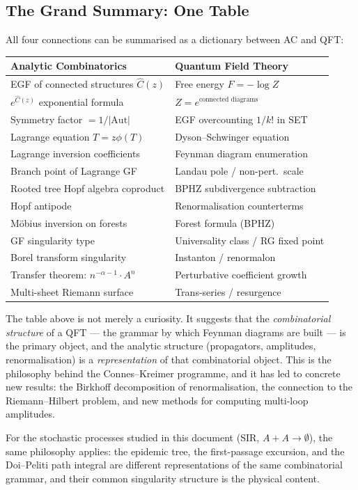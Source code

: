 \documentclass[11pt,a4paper]{article}
\theoremstyle{definition}
\begin{document}
\subsection{The Grand Summary: One Table}

All four connections can be summarised as a dictionary between AC and QFT:

\begin{center}
\renewcommand{\arraystretch}{1.3}
\begin{tabular}{ll}
\toprule
\textbf{Analytic Combinatorics} & \textbf{Quantum Field Theory} \\
\midrule
EGF of connected structures $\hat{C}(z)$ & Free energy $F = -\log Z$ \\
$e^{\hat{C}(z)}$ exponential formula & $Z = e^{\text{connected diagrams}}$ \\
Symmetry factor $= 1/|\mathrm{Aut}|$ & EGF overcounting $1/k!$ in SET \\
Lagrange equation $T = z\phi(T)$ & Dyson--Schwinger equation \\
Lagrange inversion coefficients & Feynman diagram enumeration \\
Branch point of Lagrange GF & Landau pole / non-pert.\ scale \\
Rooted tree Hopf algebra coproduct & BPHZ subdivergence subtraction \\
Hopf antipode & Renormalisation counterterms \\
M\"obius inversion on forests & Forest formula (BPHZ) \\
GF singularity type & Universality class / RG fixed point \\
Borel transform singularity & Instanton / renormalon \\
Transfer theorem: $n^{-\alpha-1} \cdot A^n$ & Perturbative coefficient growth \\
Multi-sheet Riemann surface & Trans-series / resurgence \\
\bottomrule
\end{tabular}
\end{center}

\begin{keybox}
The table above is not merely a curiosity. It suggests that the
\emph{combinatorial structure} of a QFT --- the grammar by which Feynman diagrams
are built --- is the primary object, and the analytic structure (propagators,
amplitudes, renormalisation) is a \emph{representation} of that combinatorial
object. This is the philosophy behind the Connes--Kreimer programme, and it
has led to concrete new results: the Birkhoff decomposition of renormalisation,
the connection to the Riemann--Hilbert problem, and new methods for computing
multi-loop amplitudes.

For the stochastic processes studied in this document (SIR, $A+A\to\emptyset$),
the same philosophy applies: the epidemic tree, the first-passage excursion,
and the Doi--Peliti path integral are different representations of the same
combinatorial grammar, and their common singularity structure is the physical
content.
\end{keybox}
\end{document}
